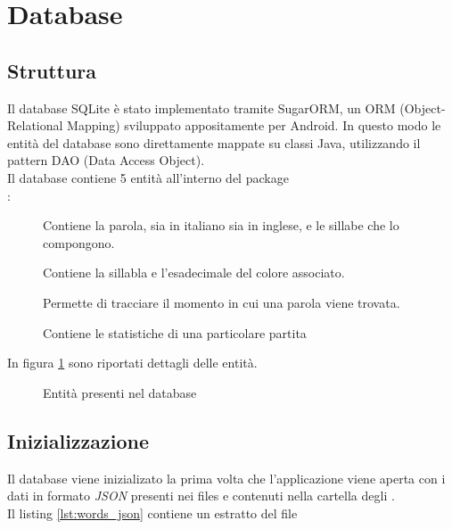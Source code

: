 


\section{Database}

\subsection{Struttura}
\label{structure}
Il database SQLite è stato implementato tramite SugarORM, un ORM (Object-Relational Mapping) sviluppato appositamente per Android. In questo modo le entità del database sono direttamente mappate su classi Java, utilizzando il pattern DAO (Data Access Object).\\
Il database contiene 5 entità all'interno del package \\:
\begin{description}
	\item[] Contiene la parola, sia in italiano sia in inglese, e le sillabe che lo compongono.
	\item[] Contiene la sillabla e l'esadecimale del colore associato.
	\item[] Permette di tracciare il momento in cui una parola viene trovata.
	\item[] Contiene le statistiche di una particolare partita
\end{description}
In figura \ref{fig:entities} sono riportati dettagli delle entità.

\begin{figure}[h!]
\label{fig:entities}
  \centering
  \caption{Entità presenti nel database}
\end{figure}

\subsection{Inizializzazione}
Il database viene inizializato la prima volta che l'applicazione viene aperta con i dati in formato \textit{JSON} presenti nei files  e  contenuti nella cartella degli .\\
Il listing \ref{lst:words_json} contiene un estratto del file 


